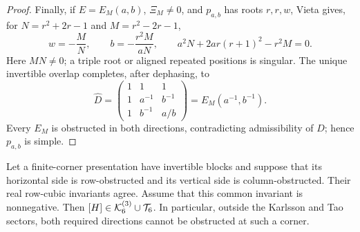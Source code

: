 \begin{proof}
{Finally, if $E=E_M(a,b)$, $\Xi_M\ne0$, and $p_{a,b}$ has roots $r,r,w$, Vieta gives, for $N=r^2+2r-1$ and $M=r^2-2r-1$,}
\begin{equation}
{w=-\frac{M}{N},\qquad
b=-\frac{r^2M}{aN},\qquad
a^2N+2ar(r+1)^2-r^2M=0.}
\label{eq:supp-main-repeated-root-relations}
\end{equation}
{Here $MN\ne0$; a triple root or aligned repeated positions is singular.  The unique invertible overlap completes, after dephasing, to}
\begin{equation}
{\widehat D=
\begin{pmatrix}1&1&1\\1&a^{-1}&b^{-1}\\1&b^{-1}&a/b\end{pmatrix}
=E_M(a^{-1},b^{-1}).}
\label{eq:supp-main-repeated-opposite}
\end{equation}
{Every $E_M$ is obstructed in both directions, contradicting admissibility of $D$; hence $p_{a,b}$ is simple.}
\end{proof}


\begin{lemma}
\label{lem:supp-two-sided-badness}
{Let a finite-corner presentation have invertible blocks and suppose that its horizontal side is row-obstructed and its vertical side is column-obstructed. Their real row-cubic invariants agree. Assume that this common invariant is nonnegative. Then $[H]\in\mathcal K_6^{(3)}\cup\mathcal T_6$. In particular, outside the Karlsson and Tao sectors, both required directions cannot be obstructed at such a corner.}
\end{lemma}

